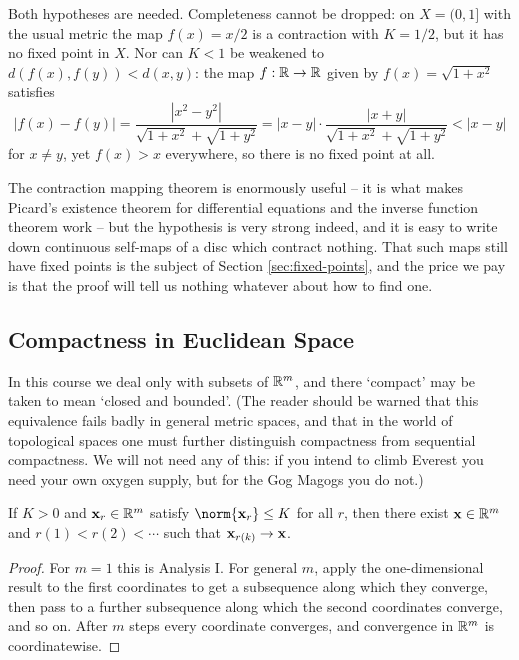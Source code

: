 \documentclass[a4paper]{scrartcl}
\begin{document}
Both hypotheses are needed. Completeness cannot be dropped: on $X = (0,1]$ with the usual metric the map $f(x) = x/2$ is a contraction with $K=1/2$, but it has no fixed point in $X$. Nor can $K<1$ be weakened to $d(f(x),f(y))<d(x,y)$: the map $f : \mathbb{R}\to\mathbb{R}$ given by $f(x) = \sqrt{1+x^2}$ satisfies
$$|f(x)-f(y)| = \frac{|x^2-y^2|}{\sqrt{1+x^2}+\sqrt{1+y^2}} = |x-y|\cdot\frac{|x+y|}{\sqrt{1+x^2}+\sqrt{1+y^2}} < |x-y|$$
for $x \neq y$, yet $f(x)>x$ everywhere, so there is no fixed point at all.

The contraction mapping theorem is enormously useful -- it is what makes Picard's existence theorem for differential equations and the inverse function theorem work -- but the hypothesis is very strong indeed, and it is easy to write down continuous self-maps of a disc which contract nothing. That such maps still have fixed points is the subject of Section \ref{sec:fixed-points}, and the price we pay is that the proof will tell us nothing whatever about how to find one.

\subsection{Compactness in Euclidean Space}

In this course we deal only with subsets of $\mathbb{R}^m$, and there `compact' may be taken to mean `closed and bounded'. (The reader should be warned that this equivalence fails badly in general metric spaces, and that in the world of topological spaces one must further distinguish compactness from sequential compactness. We will not need any of this: if you intend to climb Everest you need your own oxygen supply, but for the Gog Magogs you do not.)

\begin{theorem}
	If $K > 0$ and $\mathbf{x}_r \in \mathbb{R}^m$ satisfy $\norm{\vv{x}_r} \leq K$ for all $r$, then there exist $\mathbf{x} \in \mathbb{R}^m$ and $r(1) < r(2) < \cdots$ such that $\mathbf{x}_{r(k)} \to \mathbf{x}$.
\end{theorem}

\begin{proof}
	For $m=1$ this is Analysis I. For general $m$, apply the one-dimensional result to the first coordinates to get a subsequence along which they converge, then pass to a further subsequence along which the second coordinates converge, and so on. After $m$ steps every coordinate converges, and convergence in $\mathbb{R}^m$ is coordinatewise.
\end{proof}
\end{document}
